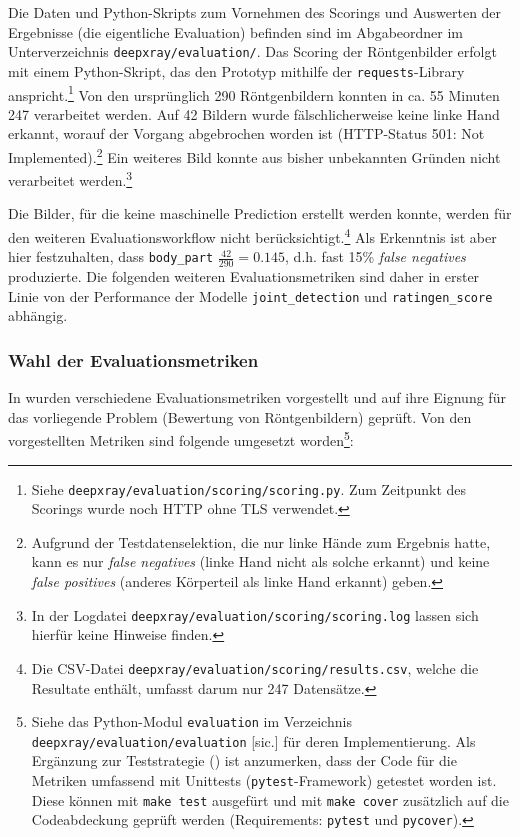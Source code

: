 Die Daten und Python-Skripts zum Vornehmen des Scorings und Auswerten der Ergebnisse (die eigentliche Evaluation) befinden sind im Abgabeordner im Unterverzeichnis \texttt{deepxray/evaluation/}. Das Scoring der Röntgenbilder erfolgt mit einem Python-Skript, das den Prototyp mithilfe der \texttt{requests}-Library anspricht.\footnote{Siehe \texttt{deepxray/evaluation/scoring/scoring.py}. Zum Zeitpunkt des Scorings wurde noch HTTP ohne TLS verwendet.} Von den ursprünglich 290 Röntgenbildern konnten in ca. 55 Minuten 247 verarbeitet werden. Auf 42 Bildern wurde fälschlicherweise keine linke Hand erkannt, worauf der Vorgang abgebrochen worden ist (HTTP-Status 501: Not Implemented).\footnote{Aufgrund der Testdatenselektion, die nur linke Hände zum Ergebnis hatte, kann es nur \textit{false negatives} (linke Hand nicht als solche erkannt) und keine \textit{false positives} (anderes Körperteil als linke Hand erkannt) geben.} Ein weiteres Bild konnte aus bisher unbekannten Gründen nicht verarbeitet werden.\footnote{In der Logdatei \texttt{deepxray/evaluation/scoring/scoring.log} lassen sich hierfür keine Hinweise finden.}

Die Bilder, für die keine maschinelle Prediction erstellt werden konnte, werden für den weiteren Evaluationsworkflow nicht berücksichtigt.\footnote{Die CSV-Datei \texttt{deepxray/evaluation/scoring/results.csv}, welche die Resultate enthält, umfasst darum nur 247 Datensätze.} Als Erkenntnis ist aber hier festzuhalten, dass \texttt{body\_part} $\frac{42}{290}=0.145$, d.h. fast 15\% \textit{false negatives} produzierte. Die folgenden weiteren Evaluationsmetriken sind daher in erster Linie von der Performance der Modelle \texttt{joint\_detection} und \texttt{ratingen\_score} abhängig.

\subsubsection{Wahl der Evaluationsmetriken}

In  wurden verschiedene Evaluationsmetriken vorgestellt und auf ihre Eignung für das vorliegende Problem (Bewertung von Röntgenbildern) geprüft. Von den vorgestellten Metriken sind folgende umgesetzt worden\footnote{Siehe das Python-Modul \texttt{evaluation} im Verzeichnis \texttt{deepxray/evaluation/evaluation} [sic.] für deren Implementierung. Als Ergänzung zur Teststrategie () ist anzumerken, dass der Code für die Metriken umfassend mit Unittests (\texttt{pytest}-Framework) getestet worden ist. Diese können mit \texttt{make test} ausgefürt und mit \texttt{make cover} zusätzlich auf die Codeabdeckung geprüft werden (Requirements: \texttt{pytest} und \texttt{pycover}).}:

